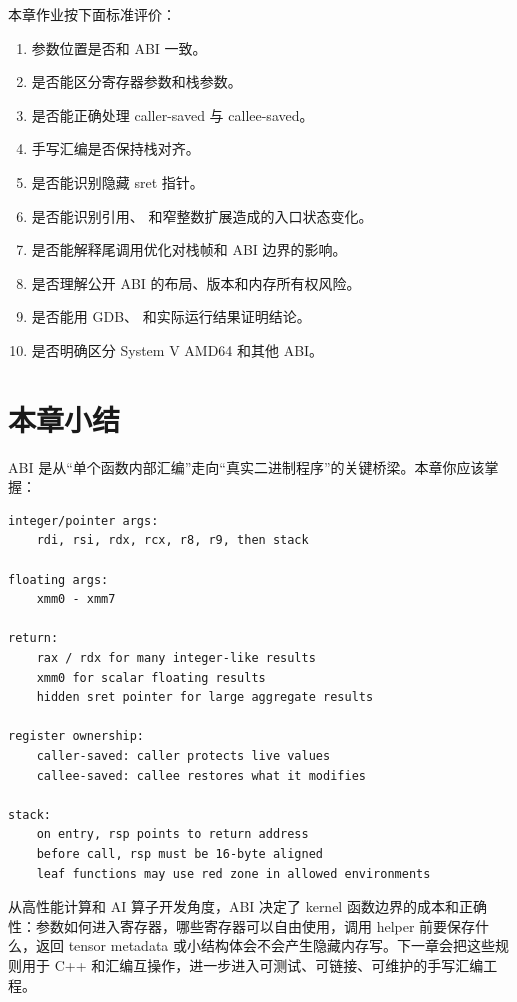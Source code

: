 \begin{exercisebox}
本章作业按下面标准评价：

\begin{enumerate}
  \item 参数位置是否和 ABI 一致。
  \item 是否能区分寄存器参数和栈参数。
  \item 是否能正确处理 caller-saved 与 callee-saved。
  \item 手写汇编是否保持栈对齐。
  \item 是否能识别隐藏 sret 指针。
  \item 是否能识别引用、 和窄整数扩展造成的入口状态变化。
  \item 是否能解释尾调用优化对栈帧和 ABI 边界的影响。
  \item 是否理解公开 ABI 的布局、版本和内存所有权风险。
  \item 是否能用 GDB、 和实际运行结果证明结论。
  \item 是否明确区分 System V AMD64 和其他 ABI。
\end{enumerate}
\end{exercisebox}

\section{本章小结}

ABI 是从“单个函数内部汇编”走向“真实二进制程序”的关键桥梁。本章你应该掌握：

\begin{lstlisting}
integer/pointer args:
    rdi, rsi, rdx, rcx, r8, r9, then stack

floating args:
    xmm0 - xmm7

return:
    rax / rdx for many integer-like results
    xmm0 for scalar floating results
    hidden sret pointer for large aggregate results

register ownership:
    caller-saved: caller protects live values
    callee-saved: callee restores what it modifies

stack:
    on entry, rsp points to return address
    before call, rsp must be 16-byte aligned
    leaf functions may use red zone in allowed environments
\end{lstlisting}

从高性能计算和 AI 算子开发角度，ABI 决定了 kernel 函数边界的成本和正确性：参数如何进入寄存器，哪些寄存器可以自由使用，调用 helper 前要保存什么，返回 tensor metadata 或小结构体会不会产生隐藏内存写。下一章会把这些规则用于 C++ 和汇编互操作，进一步进入可测试、可链接、可维护的手写汇编工程。
